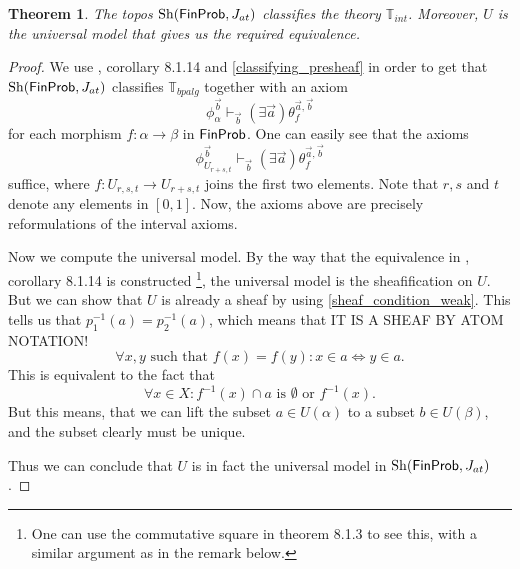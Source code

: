 \documentclass[a4paper]{amsproc}
\theoremstyle{plain}
\newtheorem{theorem}{Theorem}[section]
\theoremstyle{definition}
\theoremstyle{remark}
\numberwithin{equation}{section}
\DeclareMathOperator{\Sh}{Sh}
\newcommand{\FinProb}{\textup{\textsf{FinProb}}}
\begin{document}
\begin{theorem} \label{classifying}
The topos $\Sh(\FinProb,J_{at})$ classifies the theory $\mathbb{T}_{int}$. Moreover, $U$ is the universal model that gives us the required equivalence.
\end{theorem}
\begin{proof}
We use \cite{caramello_book}, corollary 8.1.14 and \ref{classifying_presheaf} in order to get that $\Sh(\FinProb,J_{at})$ classifies $\mathbb{T}_{bpalg}$ together with an axiom
\[
\phi_{\alpha}^{\vec{b}} \vdash_{\vec{b}} (\exists \vec{a}) \theta_f^{\vec{a},\vec{b}}
\]
for each morphism $f: \alpha \to \beta$ in $\FinProb$. One can easily see that the axioms
\[
\phi_{U_{r+s,t}}^{\vec{b}} \vdash_{\vec{b}} (\exists \vec{a}) \theta_f^{\vec{a},\vec{b}}
\]
suffice, where $f: U_{r,s,t} \to U_{r+s,t}$ joins the first two elements. Note that $r,s$ and $t$ denote any elements in $[0,1]$. Now, the axioms above are precisely reformulations of the interval axioms.

Now we compute the universal model. By the way that the equivalence in \cite{caramello_book}, corollary 8.1.14 is constructed \footnote{One can use the commutative square in theorem 8.1.3 to see this, with a similar argument as in the remark below.}, the universal model is the sheafification on $U$. But we can show that $U$ is already a sheaf by using \ref{sheaf_condition_weak}. This tells us that $p_1^{-1}(a) = p_2^{-1}(a)$, which means that
IT IS A SHEAF BY ATOM NOTATION! %
\[
\forall x,y \text{ such that } f(x) = f(y): x \in a \Leftrightarrow y \in a .
\]
This is equivalent to the fact that
\[
\forall x \in X: f^{-1}(x) \cap a \text{ is } \emptyset \text{ or } f^{-1}(x) .
\]
But this means, that we can lift the subset $a \in U(\alpha)$ to a subset $b \in U(\beta)$, and the subset clearly must be unique.

Thus we can conclude that $U$ is in fact the universal model in $\Sh(\FinProb, J_{at})$.
\end{proof}
\end{document}
